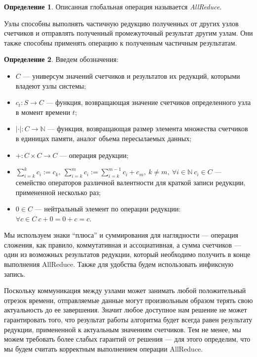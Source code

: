 \documentclass{article}
\theoremstyle{plain}
\theoremstyle{plain}
\theoremstyle{plain}
\theoremstyle{plain}
\theoremstyle{definition}
\newtheorem{definition}{Определение}[section]
\theoremstyle{remark}
\theoremstyle{plain}
\begin{document}
\begin{definition}
    Описанная глобальная операция называется \textit{AllReduce}.
\end{definition}

Узлы способны выполнять частичную редукцию полученных от других узлов счетчиков и отправлять полученный промежуточный результат другим узлам. Они также способны применять операцию к полученным частичным результатам.

\begin{definition}
    Введем обозначения:
    \begin{itemize}
        \item $C$ --- универсум значений счетчиков и результатов их редукций, которыми владеют узлы системы;
        \item $c_t \colon S \to C$ --- функция, возвращающая значение счетчиков определенного узла в момент времени $t$;
        \item $|\cdot| \colon C \to \mathbb{N}$ --- функция, возвращающая размер элемента множества счетчиков в единицах памяти, аналог объема пересылаемых данных;
        \item $+ \colon C \times C \to C$ --- операция редукции;
        \item $\displaystyle \sum_{i = k}^k c_i := c_k,\ \displaystyle \sum_{i = k}^m c_i := \displaystyle \sum_{i = k}^{m - 1} c_i + c_m,\ k \neq m,\ \forall i \in \mathbb{N}\ c_i \in C$ --- семейство операторов различной валентности для краткой записи редукции, примененной несколько раз;
        \item $0 \in C$ --- нейтральный элемент по операции редукции: $\forall c \in C\ c + 0 = 0 + c = c$.
    \end{itemize}
\end{definition}

Мы используем знаки \enquote{плюса} и суммирования для наглядности --- операция сложения, как правило, коммутативная и ассоциативная, а сумма счетчиков --- один из возможных результатов редукции, который необходимо получить в конце выполнения AllReduce. Также для удобства будем использовать инфиксную запись.

Поскольку коммуникация между узлами может занимать любой положительный отрезок времени, отправляемые данные могут произвольным образом терять свою актуальность до ее завершения. Значит любое доступное нам решение не может гарантировать того, что результат работы алгоритма будет всегда равен результату редукции, примененной к актуальным значениям счетчиков. Тем не менее, мы можем требовать более слабых гарантий от решения --- для этого определим, что мы будем считать корректным выполнением операции AllReduce.
\end{document}
